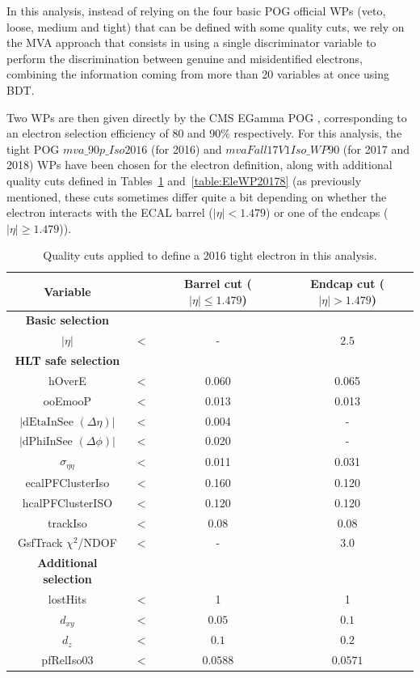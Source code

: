 \documentclass[a4paper, 10pt, openright]{report}
\begin{document}
In this analysis, instead of relying on the four basic \ac{POG} official \acp{WP} (veto, loose, medium and tight) that can be defined with some quality cuts, we rely on the \ac{MVA} approach that consists in using a single discriminator variable to perform the discrimination between genuine and misidentified electrons, combining the information coming from more than 20 variables at once using \ac{BDT}. 

Two \acp{WP} are then given directly by the \ac{CMS} EGamma \ac{POG} \cite{ElePOG}, corresponding to an electron selection efficiency of 80 and 90\% respectively. For this analysis, the tight \ac{POG} $mva\_90p\_Iso2016$ (for 2016) and $mvaFall17V1Iso\_WP90$ (for 2017 and 2018) \acp{WP} have been chosen for the electron definition, along with additional quality cuts defined in Tables~\ref{table:EleWP2016} and~\ref{table:EleWP20178} (as previously mentioned, these cuts sometimes differ quite a bit depending on whether the electron interacts with the \ac{ECAL} barrel ($|\eta| < 1.479$) or one of the endcaps ($|\eta| \geq 1.479$)).

\begin{table}
\begin{center}
\begin{tabular}{ c|c|c|c } 
 \hline
 Variable & & Barrel cut ($|\eta| \leq 1.479$) & Endcap cut ($|\eta| > 1.479$) \\
\hline
\textbf{Basic selection} & &  \\ 
 $|\eta|$ & $<$ & - & $2.5$ \\
 \hline
\textbf{\ac{HLT} safe selection} & &  \\ 
hOverE & $<$ & 0.060 & 0.065 \\
 ooEmooP & $<$ & 0.013 & 0.013 \\
 $|\text{dEtaInSee } (\Delta \eta)|$ & $<$ & 0.004 & - \\  
 $|\text{dPhiInSee } (\Delta \phi)|$ & $<$ & 0.020 & - \\  
  $\sigma_{\eta \eta}$ & $<$ & 0.011 & 0.031 \\
  ecalPFClusterIso & $<$ & 0.160 & 0.120 \\
  hcalPFClusterISO & $<$ & 0.120 & 0.120 \\
  trackIso & $<$ & 0.08 & 0.08 \\
  GsfTrack $\chi^2$/NDOF & $<$ & - & 3.0 \\
 	\hline
 	\textbf{Additional selection} & &  \\ 
 lostHits & $<$ & 1 & 1 \\
 $d_{xy}$ & $<$ &  $0.05$ & $0.1$ \\
 $d_z$ & $<$ & $0.1$ & $0.2$ \\
 pfRelIso03 & $<$ & $0.0588$ & $0.0571$ \\
\hline
\end{tabular}
\caption{Quality cuts applied to define a 2016 tight electron in this analysis.}
\label{table:EleWP2016}
\end{center}
\end{table}	
\end{document}
